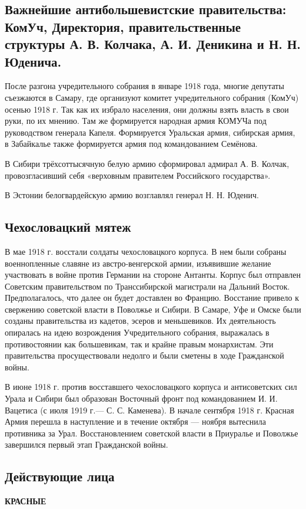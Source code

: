 \subsection{Важнейшие антибольшевистские правительства: КомУч, Директория, правительственные структуры А. В. Колчака, А. И. Деникина и Н. Н. Юденича.}

После разгона учредительного собрания в январе 1918 года, многие депутаты съезжаются в Самару, где организуют комитет учредительного собрания (КомУч) осенью 1918 г. Так как их избрало населения, они должны взять власть в свои руки, по их мнению. Там же формируется народная армия КОМУЧа под руководством генерала Капеля. Формируется Уральская армия, сибирская армия, в Забайкалье также формируется армия под командованием Семёнова. 

В Сибири трёхсоттысячную белую армию сформировал адмирал А. В. Колчак, провозгласивший себя «верховным правителем Российского государства».

В Эстонии белогвардейскую армию возглавлял генерал Н. Н. Юденич.

\subsection{Чехословацкий мятеж}

В мае 1918 г. восстали солдаты чехословацкого корпуса. В нем были собраны
военнопленные славяне из австро-венгерской армии, изъявившие желание участвовать в войне
против Германии на стороне Антанты. Корпус был отправлен Советским правительством по
Транссибирской магистрали на Дальний Восток. Предполагалось, что далее он будет доставлен
во Францию. Восстание привело к свержению советской власти в Поволжье и Сибири. В
Самаре, Уфе и Омске были созданы правительства из кадетов, эсеров и меньшевиков. Их
деятельность опиралась на идею возрождения Учредительного собрания, выражалась в
противостоянии как большевикам, так и крайне правым монархистам. Эти правительства
просуществовали недолго и были сметены в ходе Гражданской войны.

В июне 1918 г. против восставшего чехословацкого корпуса и антисоветских сил Урала и
Сибири был образован Восточный фронт под командованием И. И. Вацетиса (с июля 1919 г.—
С. С. Каменева). В начале сентября 1918 г. Красная Армия перешла в наступление и в течение
октября — ноября вытеснила противника за Урал. Восстановлением советской власти в
Приуралье и Поволжье завершился первый этап Гражданской войны.

\subsection{Действующие лица}
\textbf{КРАСНЫЕ}

